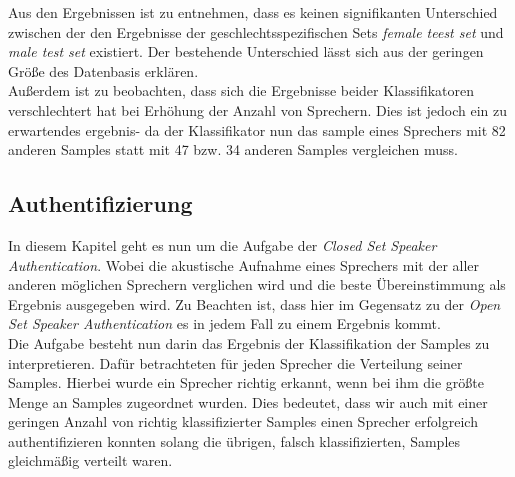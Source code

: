 \begin{table}[h]
\label{table:resultsClassifiers}
\end{table}

Aus den Ergebnissen ist zu entnehmen, dass es keinen signifikanten Unterschied zwischen der den Ergebnisse der geschlechtsspezifischen Sets \textit{female teest set} und \textit{male test set} existiert. Der bestehende Unterschied lässt sich aus der geringen Größe des Datenbasis erklären.\\


Außerdem ist zu beobachten, dass sich die Ergebnisse beider Klassifikatoren verschlechtert hat bei Erhöhung der Anzahl von Sprechern.
Dies ist jedoch ein zu erwartendes ergebnis- da der Klassifikator nun das sample eines Sprechers mit 82 anderen Samples statt mit 47 bzw. 34 anderen Samples vergleichen muss.\\




\subsection{Authentifizierung}
\label{auth}

In diesem Kapitel geht es nun um die Aufgabe der \textit{Closed Set Speaker Authentication}. Wobei die akustische Aufnahme eines Sprechers mit der aller anderen möglichen Sprechern verglichen wird und die beste Übereinstimmung als Ergebnis ausgegeben wird.\cite{beigi} Zu Beachten ist, dass hier im Gegensatz zu der \textit{Open Set Speaker Authentication} es in jedem Fall zu einem Ergebnis kommt. \\

Die Aufgabe besteht nun darin das Ergebnis der Klassifikation der Samples zu interpretieren. Dafür betrachteten für jeden Sprecher die Verteilung seiner Samples.
Hierbei wurde ein Sprecher richtig erkannt, wenn bei ihm die größte Menge an Samples zugeordnet wurden. Dies bedeutet, dass wir auch mit einer geringen Anzahl von richtig klassifizierter Samples einen Sprecher erfolgreich authentifizieren konnten solang die übrigen, falsch klassifizierten, Samples gleichmäßig verteilt waren. 

